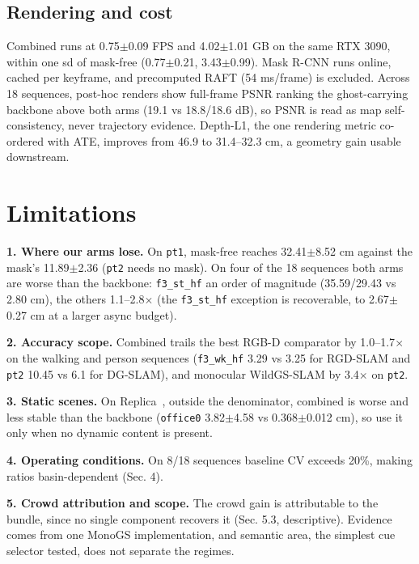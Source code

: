 \subsection{Rendering and cost}


Combined runs at 0.75$\pm$0.09 FPS and 4.02$\pm$1.01 GB on the same RTX 3090, within one sd of mask-free (0.77$\pm$0.21, 3.43$\pm$0.99). Mask R-CNN runs online, cached per keyframe, and precomputed RAFT (54 ms/frame) is excluded. Across 18 sequences, post-hoc renders show full-frame PSNR ranking the ghost-carrying backbone above both arms (19.1 vs 18.8/18.6 dB), so PSNR is read as map self-consistency, never trajectory evidence. Depth-L1, the one rendering metric co-ordered with ATE, improves from 46.9 to 31.4--32.3 cm, a geometry gain usable downstream.




\section{Limitations}


\textbf{1. Where our arms lose.} On \texttt{pt1}, mask-free reaches 32.41$\pm$8.52 cm against the mask's 11.89$\pm$2.36 (\texttt{pt2} needs no mask). On four of the 18 sequences both arms are worse than the backbone: \texttt{f3\_st\_hf} an order of magnitude (35.59/29.43 vs 2.80 cm), the others 1.1--2.8$\times$ (the \texttt{f3\_st\_hf} exception is recoverable, to 2.67$\pm$0.27 cm at a larger async budget).


\textbf{2. Accuracy scope.} Combined trails the best RGB-D comparator by 1.0--1.7$\times$ on the walking and person sequences (\texttt{f3\_wk\_hf} 3.29 vs 3.25 for RGD-SLAM and \texttt{pt2} 10.45 vs 6.1 for DG-SLAM), and monocular WildGS-SLAM by 3.4$\times$ on \texttt{pt2}.


\textbf{3. Static scenes.} On Replica~\cite{replica}, outside the denominator, combined is worse and less stable than the backbone (\texttt{office0} 3.82$\pm$4.58 vs 0.368$\pm$0.012 cm), so use it only when no dynamic content is present.


\textbf{4. Operating conditions.} On 8/18 sequences baseline CV exceeds 20\%, making ratios basin-dependent (Sec. 4).


\textbf{5. Crowd attribution and scope.} The crowd gain is attributable to the bundle, since no single component recovers it (Sec. 5.3, descriptive). Evidence comes from one MonoGS implementation, and semantic area, the simplest cue selector tested, does not separate the regimes.




